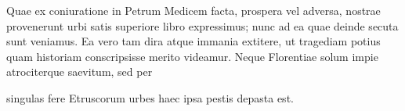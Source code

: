 \documentclass[12pt]{memoir}
\begin{document}
\beginnumbering

\pstart%

Quae ex coniuratione in Petrum Medicem facta, prospera vel adversa, 
nostrae provenerunt urbi satis superiore libro expressimus; nunc ad ea 
quae deinde secuta sunt veniamus. Ea vero tam dira atque immania
extitere, ut tragediam potius quam historiam conscripsisse merito
videamur. Neque Florentiae solum impie atrociterque saevitum, sed per

singulas fere Etruscorum urbes haec ipsa pestis depasta est.

\pend 
\endnumbering
\end{document}

